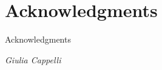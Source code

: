 \chapter*{Acknowledgments}

Acknowledgments

\begin{flushright}
	\textit{Giulia Cappelli}
\end{flushright}
